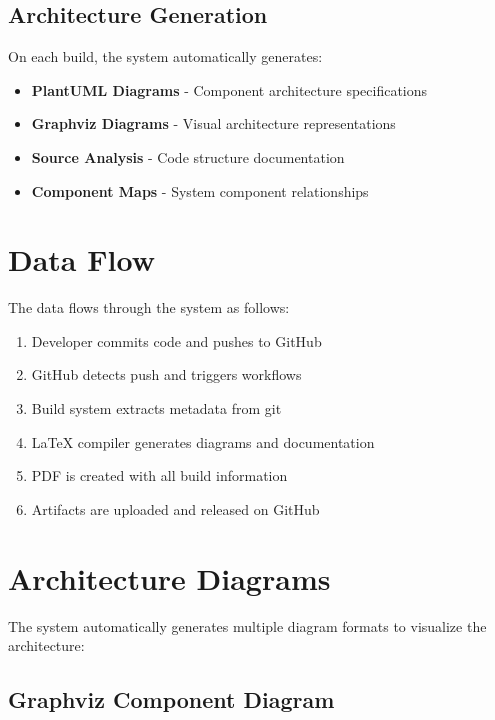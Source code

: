 \subsection{Architecture Generation}

On each build, the system automatically generates:

\begin{itemize}
    \item \textbf{PlantUML Diagrams} - Component architecture specifications
    \item \textbf{Graphviz Diagrams} - Visual architecture representations
    \item \textbf{Source Analysis} - Code structure documentation
    \item \textbf{Component Maps} - System component relationships
\end{itemize}

\section{Data Flow}
\label{sec:DataFlow}

The data flows through the system as follows:

\begin{enumerate}
    \item Developer commits code and pushes to GitHub
    \item GitHub detects push and triggers workflows
    \item Build system extracts metadata from git
    \item LaTeX compiler generates diagrams and documentation
    \item PDF is created with all build information
    \item Artifacts are uploaded and released on GitHub
\end{enumerate}

\section{Architecture Diagrams}
\label{sec:ArchDiagrams}

The system automatically generates multiple diagram formats to visualize the architecture:

\subsection{Graphviz Component Diagram}

